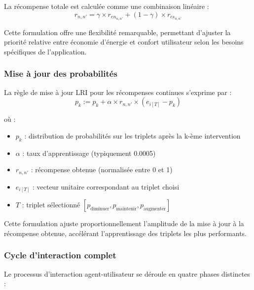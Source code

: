 \documentclass[a4paper,11pt]{article}
\begin{document}
La récompense totale est calculée comme une combinaison linéaire :
$$r_{n,n'} = \gamma \times r_{en_{n,n'}} + (1 - \gamma) \times r_{cs_{n,n'}}$$

Cette formulation offre une flexibilité remarquable, permettant d'ajuster la priorité relative entre économie d'énergie et confort utilisateur selon les besoins spécifiques de l'application.

\subsubsection{Mise à jour des probabilités}

La règle de mise à jour LRI pour les récompenses continues s'exprime par :
$$p_k := p_k + \alpha \times r_{n,n'} \times (e_{i[T]} - p_k)$$

où :
\begin{itemize}
    \item $p_k$ : distribution de probabilités sur les triplets après la k-ème intervention
    \item $\alpha$ : taux d'apprentissage (typiquement 0.0005)
    \item $r_{n,n'}$ : récompense obtenue (normalisée entre 0 et 1)
    \item $e_{i[T]}$ : vecteur unitaire correspondant au triplet choisi
    \item $T$ : triplet sélectionné $[p_{\text{diminuer}}, p_{\text{maintenir}}, p_{\text{augmenter}}]$
\end{itemize}

Cette formulation ajuste proportionnellement l'amplitude de la mise à jour à la récompense obtenue, accélérant l'apprentissage des triplets les plus performants.

\subsubsection{Cycle d'interaction complet}

Le processus d'interaction agent-utilisateur se déroule en quatre phases distinctes :
\end{document}
